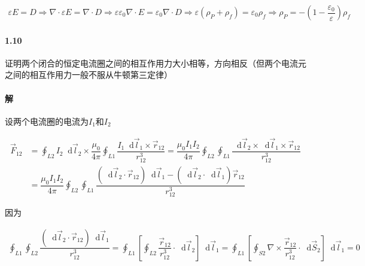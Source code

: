 \documentclass{article}
\newcommand*{\md}{\mathop{}\!\mathrm{d}}
\begin{document}
\begin{equation*}
  \begin{aligned}
    \varepsilon E = D \Rightarrow \nabla \cdot \varepsilon E = \nabla \cdot D \Rightarrow \varepsilon \varepsilon_0 \nabla \cdot E = \varepsilon_0 \nabla \cdot D \Rightarrow \varepsilon \left( \rho_P + \rho_f \right) = \varepsilon_0 \rho_f \Rightarrow \rho_P = - \left( 1 - \dfrac{\varepsilon_0}{\varepsilon}  \right) \rho_f
  \end{aligned}
\end{equation*}

\paragraph{1.10}

证明两个闭合的恒定电流圈之间的相互作用力大小相等，方向相反（但两个电流元之间的相互作用力一般不服从牛顿第三定律）

\paragraph{解}

设两个电流圈的电流为$I_1$和$I_2$

\begin{equation*}
  \begin{aligned}
    \vec{F}_{12}
    &= \oint_{L2} I_2 \md \vec{l}_2 \times \dfrac{\mu_0}{4\pi} \oint_{L1} \dfrac{I_1 \md \vec{l}_1 \times \vec{r}_{12}}{r_{12}^3}
    = \dfrac{\mu_0 I_1 I_2}{4 \pi} \oint_{L2} \oint_{L1} \dfrac{\md \vec{l}_2 \times \md \vec{l}_1 \times \vec{r}_{12}}{r_{12}^3}\\
    &= \dfrac{\mu_0 I_1 I_2}{4 \pi} \oint_{L2} \oint_{L1} \dfrac{\left( \md \vec{l}_2 \cdot \vec{r}_{12} \right) \md \vec{l}_1 - \left( \md \vec{l}_2 \cdot \md \vec{l}_1 \right) \vec{r}_{12}}{r_{12}^3}
  \end{aligned}
\end{equation*}

因为

\begin{equation*}
  \begin{aligned}
    \oint_{L1} \oint_{L2} \dfrac{\left( \md \vec{l}_2 \cdot \vec{r}_{12} \right) \md \vec{l}_1}{r_{12}^3}
    = \oint_{L1} \left[ \oint_{L2} \dfrac{\vec{r}_{12}}{r_{12}^3} \cdot \md \vec{l}_2 \right] \md \vec{l}_1
    = \oint_{L1} \left[ \oint_{S2} \nabla \times \dfrac{\vec{r}_{12}}{r_{12}^3} \cdot \md \vec{S}_2 \right] \md \vec{l}_1
    = 0
  \end{aligned}
\end{equation*}
\end{document}
